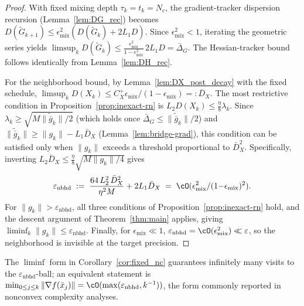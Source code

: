 \documentclass[review,onefignum,onetabnum]{siamart171218}
\begin{document}
\begin{proof}
With fixed mixing depth $\tau_k=t_k=N_c$, the gradient-tracker
dispersion recursion (Lemma~\ref{lem:DG_rec}) becomes
$D(\tilde G_{k+1})\le\epsilon_{\mathrm{mix}}^2(D(\tilde G_k)+2L_1D)$.
Since $\epsilon_{\mathrm{mix}}^2<1$, iterating the geometric series yields
$\limsup_{k}D(\tilde G_k)\le \frac{\epsilon_{\mathrm{mix}}^2}{1-\epsilon_{\mathrm{mix}}^2}\,2L_1D
=\bar\Delta_G$.
The Hessian-tracker bound follows identically from Lemma~\ref{lem:DH_rec}.

For the neighborhood bound, by Lemma~\ref{lem:DX_post_decay} with the fixed schedule,
$\limsup_k D(X_k)\le C_X^{+}\epsilon_{\mathrm{mix}}/(1-\epsilon_{\mathrm{mix}})=:\bar D_X$.
The most restrictive condition in Proposition~\ref{prop:inexact-rn}
is $L_2 D(X_k)\le\frac{\eta}{8}\lambda_k$.
Since $\lambda_k\ge\sqrt{M\|\tilde{\bar g}_k\|/2}$
(which holds once $\bar\Delta_G\le\|\tilde{\bar g}_k\|/2$) and
$\|\tilde{\bar g}_k\|\ge\|g_k\|-L_1\bar D_X$
(Lemma~\ref{lem:bridge-grad}), this condition can be satisfied only when
$\|g_k\|$ exceeds a threshold proportional to $\bar D_X^2$.
Specifically, inverting $L_2\bar D_X\le\frac{\eta}{8}\sqrt{M\|g_k\|/4}$
gives
\[
\varepsilon_{\mathrm{nbhd}}
\;:=\;
\frac{64\,L_2^2\,\bar D_X^2}{\eta^2 M}
+2L_1\bar D_X
\;=\;\cO(\epsilon_{\mathrm{mix}}^2/(1{-}\epsilon_{\mathrm{mix}})^2).
\]
For $\|g_k\|>\varepsilon_{\mathrm{nbhd}}$, all three conditions of
Proposition~\ref{prop:inexact-rn} hold, and the descent
argument of Theorem~\ref{thm:main} applies,
giving $\liminf_k\|g_k\|\le\varepsilon_{\mathrm{nbhd}}$.
Finally, for $\epsilon_{\mathrm{mix}}\ll 1$,
$\varepsilon_{\mathrm{nbhd}}=\cO(\epsilon_{\mathrm{mix}}^2)\ll\varepsilon$,
so the neighborhood is invisible at the target precision.
\end{proof}

\begin{remark}\label{rem:liminf_form}
The $\liminf$ form in Corollary~\ref{cor:fixed_nc} guarantees infinitely many visits to
the $\varepsilon_{\mathrm{nbhd}}$-ball; an equivalent statement is
$\min_{0\le j\le k}\|\nabla f(\bar x_j)\|
=\cO(\max(\varepsilon_{\mathrm{nbhd}}, k^{-1}))$,
the form commonly reported in nonconvex complexity analyses.
\end{remark}
\end{document}
